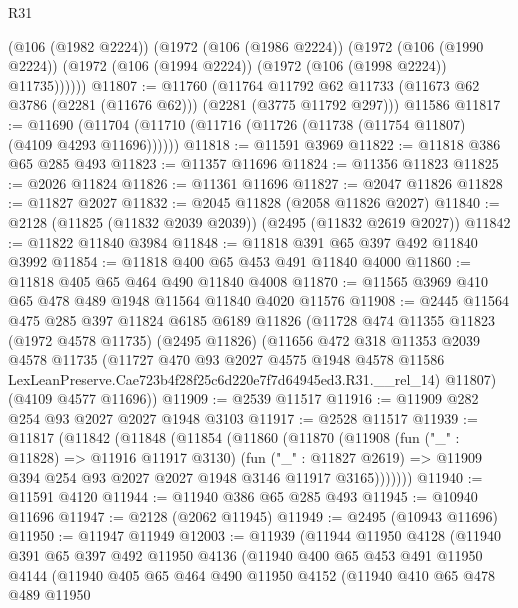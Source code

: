\begin{lexlean}{R31}
\begin{coremodule}
        (@106 (@1982 @2224))
        (@1972
          (@106 (@1986 @2224))
          (@1972
            (@106 (@1990 @2224))
            (@1972 (@106 (@1994 @2224)) (@1972 (@106 (@1998 @2224)) @11735))))))
@11807 := @11760
    (@11764 @11792 @62 @11733 (@11673 @62 @3786 (@2281 (@11676 @62))) (@2281 (@3775 @11792 @297)))
    @11586
@11817 := @11690 (@11704 (@11710 (@11716 (@11726 (@11738 (@11754 @11807) (@4109 @4293 @11696))))))
@11818 := @11591 @3969
@11822 := @11818 @386 @65 @285 @493
@11823 := @11357 @11696
@11824 := @11356 @11823
@11825 := @2026 @11824
@11826 := @11361 @11696
@11827 := @2047 @11826
@11828 := @11827 @2027
@11832 := @2045 @11828 (@2058 @11826 @2027)
@11840 := @2128 (@11825 (@11832 @2039 @2039)) (@2495 (@11832 @2619 @2027))
@11842 := @11822 @11840 @3984
@11848 := @11818 @391 @65 @397 @492 @11840 @3992
@11854 := @11818 @400 @65 @453 @491 @11840 @4000
@11860 := @11818 @405 @65 @464 @490 @11840 @4008
@11870 := @11565 @3969 @410 @65 @478 @489 @1948 @11564 @11840 @4020 @11576
@11908 := @2445
    @11564
    @475
    @285
    @397
    @11824
    @6185
    @6189
    @11826
    (@11728
      @474
      @11355
      @11823
      (@1972 @4578 @11735)
      (@2495 @11826)
      (@11656
        @472
        @318
        @11353
        @2039
        @4578
        @11735
        (@11727
          @470
          @93
          @2027
          @4575
          @1948
          @4578
          @11586
          LexLeanPreserve.Cae723b4f28f25c6d220e7f7d64945ed3.R31.__rel_14)
        @11807)
      (@4109 @4577 @11696))
@11909 := @2539 @11517
@11916 := @11909 @282 @254 @93 @2027 @2027 @1948 @3103
@11917 := @2528 @11517
@11939 := @11817
    (@11842
      (@11848
        (@11854
          (@11860
            (@11870
              (@11908
                (fun ("_" : @11828) => @11916 @11917 @3130)
                (fun ("_" : @11827 @2619) =>
                @11909 @394 @254 @93 @2027 @2027 @1948 @3146 @11917 @3165)))))))
@11940 := @11591 @4120
@11944 := @11940 @386 @65 @285 @493
@11945 := @10940 @11696
@11947 := @2128 (@2062 @11945)
@11949 := @2495 (@10943 @11696)
@11950 := @11947 @11949
@12003 := @11939
    (@11944
      @11950
      @4128
      (@11940
        @391
        @65
        @397
        @492
        @11950
        @4136
        (@11940
          @400
          @65
          @453
          @491
          @11950
          @4144
          (@11940
            @405
            @65
            @464
            @490
            @11950
            @4152
            (@11940
              @410
              @65
              @478
              @489
              @11950

\end{coremodule}
\end{lexlean}
